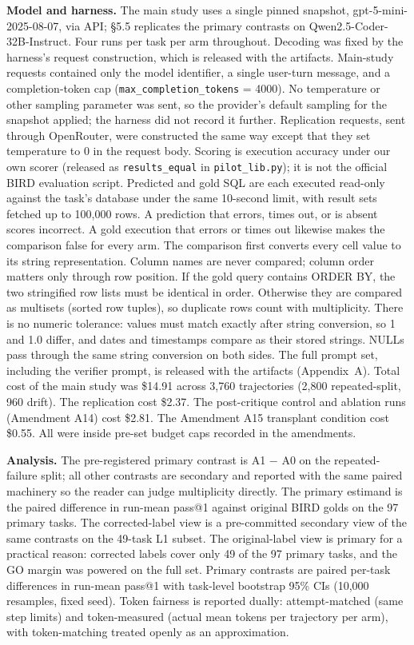 \documentclass[sigconf, nonacm]{acmart}
\begin{document}
\textbf{Model and harness.} The main study uses a single pinned snapshot, gpt-5-mini-2025-08-07, via API; \S5.5 replicates the primary contrasts on Qwen2.5-Coder-32B-Instruct. Four runs per task per arm throughout. Decoding was fixed by the harness's request construction, which is released with the artifacts. Main-study requests contained only the model identifier, a single user-turn message, and a completion-token cap (\texttt{max\_completion\_tokens} = 4000). No temperature or other sampling parameter was sent, so the provider's default sampling for the snapshot applied; the harness did not record it further. Replication requests, sent through OpenRouter, were constructed the same way except that they set temperature to 0 in the request body. Scoring is execution accuracy under our own scorer (released as \texttt{results\_equal} in \texttt{pilot\_lib.py}); it is not the official BIRD evaluation script. Predicted and gold SQL are each executed read-only against the task's database under the same 10-second limit, with result sets fetched up to 100,000 rows. A prediction that errors, times out, or is absent scores incorrect. A gold execution that errors or times out likewise makes the comparison false for every arm. The comparison first converts every cell value to its string representation. Column names are never compared; column order matters only through row position. If the gold query contains ORDER BY, the two stringified row lists must be identical in order. Otherwise they are compared as multisets (sorted row tuples), so duplicate rows count with multiplicity. There is no numeric tolerance: values must match exactly after string conversion, so 1 and 1.0 differ, and dates and timestamps compare as their stored strings. NULLs pass through the same string conversion on both sides. The full prompt set, including the verifier prompt, is released with the artifacts (Appendix~A). Total cost of the main study was \$14.91 across 3,760 trajectories (2,800 repeated-split, 960 drift). The replication cost \$2.37. The post-critique control and ablation runs (Amendment A14) cost \$2.81. The Amendment A15 transplant condition cost \$0.55. All were inside pre-set budget caps recorded in the amendments.

\textbf{Analysis.} The pre-registered primary contrast is A1 $-$ A0 on the repeated-failure split; all other contrasts are secondary and reported with the same paired machinery so the reader can judge multiplicity directly. The primary estimand is the paired difference in run-mean pass@1 against original BIRD golds on the 97 primary tasks. The corrected-label view is a pre-committed secondary view of the same contrasts on the 49-task L1 subset. The original-label view is primary for a practical reason: corrected labels cover only 49 of the 97 primary tasks, and the GO margin was powered on the full set. Primary contrasts are paired per-task differences in run-mean pass@1 with task-level bootstrap 95\% CIs (10,000 resamples, fixed seed). Token fairness is reported dually: attempt-matched (same step limits) and token-measured (actual mean tokens per trajectory per arm), with token-matching treated openly as an approximation.
\end{document}
